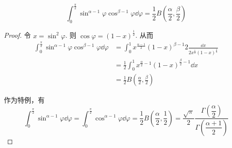 \begin{example}
$$
\int_0^\frac{\pi}{2}\sin^{\alpha-1}\varphi\cos^{\beta-1}\varphi\dd\varphi=\frac{1}{2}B\left(\frac{\alpha}{2},\frac{\beta}{2}\right)
$$
\end{example}
\begin{proof}
    令 $x=\sin^2\varphi$. 则 $\cos\varphi=(1-x)^\frac{1}{2}$. 从而
$$
\begin{aligned}
    \int_0^\frac{\pi}{2}\sin^{\alpha-1}\varphi\cos^{\beta-1}\varphi\dd\varphi&=\int_0^1 x^\frac{\alpha-1}{2}(1-x)^{\beta-1}{2}\frac{\dd x}{2x^\frac{1}{2}(1-x)^\frac{1}{2}}\\
    &=\frac{1}{2}\int_0^1x^{\frac{\alpha}{2}-1}(1-x)^{\frac{\beta}{2}-1}\dd x\\
    &=\frac{1}{2}B\left(\frac{\alpha}{2},\frac{\beta}{2}\right)
\end{aligned}
$$

    作为特例，有
$$
\int_0^\frac{\pi}{2}\sin^{\alpha-1}\varphi\dd\varphi=\int_0^\frac{\pi}{2}\cos^{\alpha-1}\varphi\dd\varphi=\frac{1}{2}B\left(\frac{\alpha}{2},\frac{1}{2}\right)=\frac{\sqrt{\pi}}{2}\frac{\Gamma\left(\dfrac{\alpha}{2}\right)}{\Gamma\left(\dfrac{\alpha+1}{2}\right)}
$$
\end{proof}

